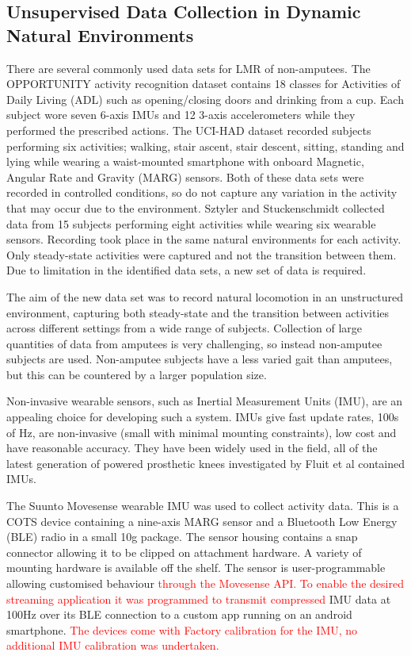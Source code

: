 \documentclass[sensors,article,submit,moreauthors,pdftex]{Definitions/mdpi}
\begin{document}
\subsection{Unsupervised Data Collection in Dynamic Natural Environments}
\label{sec:data_collection}
There are several commonly used data sets for LMR of non-amputees. The OPPORTUNITY activity recognition dataset\cite{roggan2010} contains 18  classes for Activities of Daily Living (ADL) such as opening/closing doors and drinking from a cup. Each subject wore seven 6-axis IMUs and 12 3-axis accelerometers while they performed the prescribed actions. The UCI-HAD dataset\cite{Anguita2013} recorded subjects performing six activities; walking, stair ascent, stair descent, sitting, standing and lying while wearing a waist-mounted smartphone with onboard Magnetic, Angular Rate and Gravity (MARG) sensors. Both of these data sets were recorded in controlled conditions, so do not capture any variation in the activity that may occur due to the environment. Sztyler and Stuckenschmidt collected data from 15 subjects performing eight activities while wearing six wearable sensors. Recording took place in the same natural environments for each activity. Only steady-state activities were captured and not the transition between them\cite{Sztyler2017}. Due to limitation in the identified data sets, a new set of data is required. 

The aim of the new data set was to record natural locomotion in an unstructured environment, capturing both steady-state and the transition between activities across different settings from a wide range of subjects. Collection of large quantities of data from amputees is very challenging, so instead non-amputee subjects are used. Non-amputee subjects have a less varied gait than amputees, but this can be countered by a larger population size.

Non-invasive wearable sensors, such as Inertial Measurement Units (IMU), are an appealing choice for developing such a system. IMUs give fast update rates, 100s of Hz, are non-invasive (small with minimal mounting constraints), low cost and have reasonable accuracy. They have been widely used in the field, all of the latest generation of powered prosthetic knees investigated by Fluit et al contained IMUs\cite{Fluit2020}.

The Suunto Movesense wearable IMU was used to collect activity data. This is a COTS device containing a nine-axis MARG sensor and a Bluetooth Low Energy (BLE) radio in a small 10g package. The sensor housing contains a snap connector allowing it to be clipped on attachment hardware. A variety of mounting hardware is available off the shelf. The sensor is user-programmable allowing customised behaviour \textcolor{red}{through the Movesense API. To enable the desired streaming application it was programmed to transmit compressed} IMU data at 100Hz over its BLE connection to a custom app running on an android smartphone. \textcolor{red}{The devices come with Factory calibration for the IMU, no additional IMU calibration was undertaken.}
\end{document}
